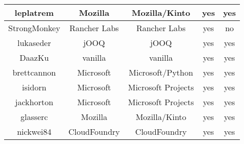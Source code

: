 \begin{table}
\begin{center}
\begin{tabular}{|c c c c c|}
            \midrule
            leplatrem            &   Mozilla           &  Mozilla/Kinto                    &   yes             &    yes \\
            \midrule
            StrongMonkey         &   Rancher Labs      &  Rancher Labs                     &   yes             &    no \\
            \midrule
            lukaseder            &   jOOQ              &  jOOQ                             &   yes             &    yes \\
            \midrule
            DaazKu               &   vanilla           &  vanilla                          &   yes             &    yes \\
            \midrule
            brettcannon          &   Microsoft         &  Microsoft/Python                 &   yes             &    yes \\
            \midrule
            isidorn              &   Microsoft         &  Microsoft Projects               &   yes             &    yes \\
            \midrule
            jackhorton           &   Microsoft         &  Microsoft Projects               &   yes             &    yes \\
            \midrule
            glasserc             &   Mozilla           &  Mozilla/Kinto                    &   yes             &    yes \\
            \midrule
            nickwei84            &   CloudFoundry      &  CloudFoundry                     &   yes             &    yes

        \bottomrule
        \end{tabular}
        \label{tbl:employee-cluster-evaluation}
    \end{center}
\end{table}
